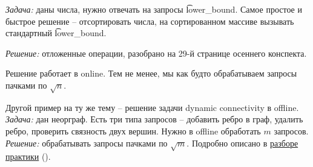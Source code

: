 {\it Задача:} даны числа, нужно отвечать на запросы \t{lower\_bound}.
Самое простое и быстрое решение -- отсортировать числа, на сортированном массиве вызывать стандартный \t{lower\_bound}.

{\it Решение:} отложенные операции, разобрано на 29-й странице осеннего конспекта.

Решение работает в online. Тем не менее, мы как будто обрабатываем запросы пачками по $\sqrt{n}$.

\down
Другой пример на ту же тему -- решение задачи dynamic connectivity в offline.\\
{\it Задача:} дан неорграф. Есть три типа запросов -- добавить ребро в граф, удалить ребро, проверить связность двух вершин. Нужно в offline обработать $m$ запросов.\\
{\it Решение:} обрабатывать запросы пачками по $\sqrt{m}$. Подробно описано в \href{http://acm.math.spbu.ru/~sk1/courses/1617s_au/practice/170504.pdf}{разборе практики} ().










